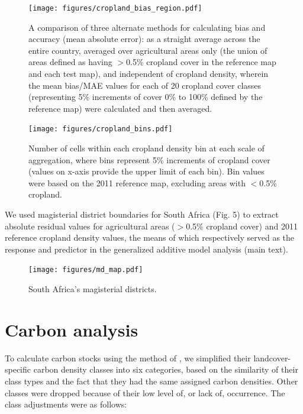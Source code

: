 \documentclass[11pt, titlepage]{article}
\begin{document}
\begin{figure}[!ht]
  \centering
     \texttt{[image: figures/cropland\_bias\_region.pdf]} 
      \caption{A comparison of three alternate methods for calculating bias and accuracy (mean absolute error): as a straight average across the entire country, averaged over agricultural areas only (the union of areas defined as having $>$0.5\% cropland cover in the reference map and each test map), and independent of cropland density, wherein the mean bias/MAE values for each of 20 cropland cover classes (representing 5\% increments of cover 0\% to 100\% defined by the reference map) were calculated and then averaged.}
      \label{fig:default}
\end{figure}

%
%

\begin{figure}[!ht]
  \centering
     \texttt{[image: figures/cropland\_bins.pdf]} 
      \caption{Number of cells within each cropland density bin at each scale of aggregation, where bins represent 5\% increments of cropland cover (values on x-axis provide the upper limit of each bin). Bin values were based on the 2011 reference map, excluding areas with $<$0.5\% cropland.}
      \label{fig:default}
\end{figure}

We used magisterial district boundaries for South Africa (Fig. 5) to extract absolute residual values for agricultural areas ($>$0.5\% cropland cover) and 2011 reference cropland density values, the means of which respectively served as the response and predictor in the generalized additive model \citep{wood_mgcv:_2001} analysis (main text). 


\begin{figure}[!ht]
  \centering
     \texttt{[image: figures/md\_map.pdf]} 
      \caption{South Africa's magisterial districts.}
      \label{fig:default}
\end{figure}

\clearpage
\section{\large Carbon analysis}

To calculate carbon stocks using the method of \citet{ruesch_new_2008}, we simplified their landcover-specific carbon density classes into six categories, based on the similarity of their class types and the fact that they had the same assigned carbon densities. Other classes were dropped because of their low level of, or lack of, occurrence. The class adjustments were as follows:
\end{document}
